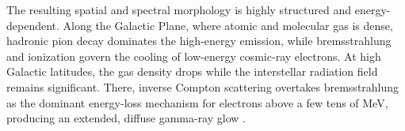 The resulting spatial and spectral morphology is highly structured and energy-dependent.
Along the Galactic Plane, where atomic and molecular gas is dense, hadronic pion decay dominates the high-energy emission, while bremsstrahlung and ionization govern the cooling of low-energy cosmic-ray electrons.
At high Galactic latitudes, the gas density drops while the interstellar radiation field remains significant.
There, inverse Compton scattering overtakes bremsstrahlung as the dominant energy-loss mechanism for electrons above a few tens of MeV, producing an extended, diffuse gamma-ray glow \cite{Pinetti:2021jjs}.



